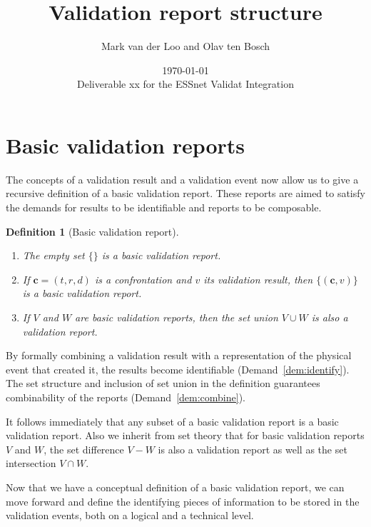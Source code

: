 \documentclass[a4paper, 11pt,titlepage]{article}
\title{Validation report structure}
\author{Mark van der Loo and Olav ten Bosch}
\date{\today\\
\vspace{1cm}
Deliverable xx for the ESSnet Validat Integration
}
\newtheorem{definition}{Definition}
\newcommand{\la}[1]{\boldsymbol{#1}}
\begin{document}
\maketitle{}

\tableofcontents{}

\newpage






 
\section{Basic validation reports}
The concepts of a validation result and a validation event now allow us to give
a recursive definition of a basic validation report. These reports are aimed to
satisfy the demands for results to be identifiable and reports to be
composable.
%
\begin{definition}[Basic validation report]\leavevmode
\begin{enumerate}[topsep=0pt,itemsep=0pt]
\item The empty set $\{\}$ is a basic validation report.
\item If $\la{c}=(t,r,d)$ is a confrontation and $v$ its validation result,
then $\{(\la{c},v)\}$ is a basic validation report.
\item If $V$ and $W$ are basic validation reports, then the set union $V\cup W$
is also a validation report.
\end{enumerate}
\label{def:basicvalidationreport}
\end{definition}
%
By formally combining a validation result with a representation of the physical
event that created it, the results become identifiable
(Demand~\ref{dem:identify}). The set structure and inclusion of set union in
the definition guarantees combinability of the reports
(Demand~\ref{dem:combine}).

It follows immediately that any subset of a basic validation report is a basic
validation report. Also we inherit from set theory that for basic validation
reports $V$ and $W$, the set difference $V-W$ is also a validation report as
well as the set intersection $V\cap W$.

Now that we have a conceptual definition of a basic validation report, we can
move forward and define the identifying pieces of information to be stored in
the validation events, both on a logical and a technical level.
\end{document}
